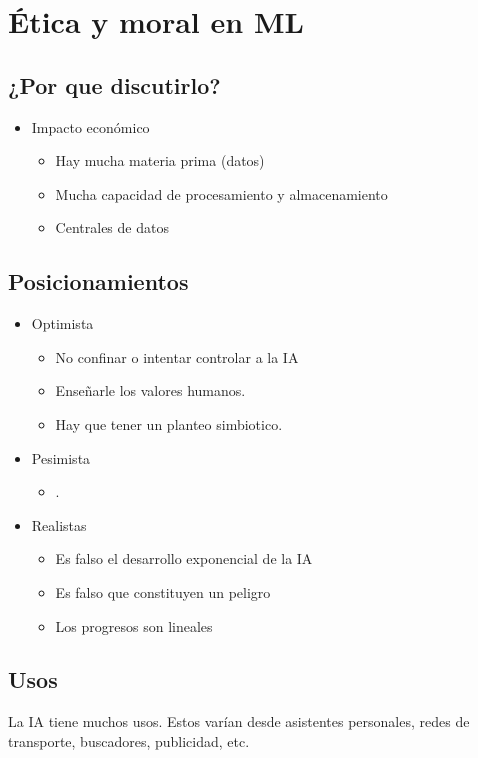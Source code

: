 \documentclass[titlepage,a4paper]{article}
\begin{document}
\section{Ética y moral en ML}
\subsection{¿Por que discutirlo?}
\begin{itemize}
    \item Impacto económico
    \begin{itemize}
        \item Hay mucha materia prima (datos)
        \item Mucha capacidad de procesamiento y almacenamiento
        \item Centrales de datos
    \end{itemize}
\end{itemize}

\subsection{Posicionamientos}
\begin{itemize}
    \item Optimista
    \begin{itemize}
        \item No confinar o intentar controlar a la IA
        \item Enseñarle los valores humanos.
        \item Hay que tener un planteo simbiotico.
    \end{itemize}
    \item Pesimista
        \begin{itemize}
        \item .%
    \end{itemize}
    \item Realistas
        \begin{itemize}
        \item Es falso el desarrollo exponencial de la IA
        \item Es falso que constituyen un peligro
        \item Los progresos son lineales
    \end{itemize}
\end{itemize}

\subsection{Usos}
La IA tiene muchos usos. Estos varían desde asistentes personales, redes de transporte, buscadores, publicidad, etc. 
\end{document}
